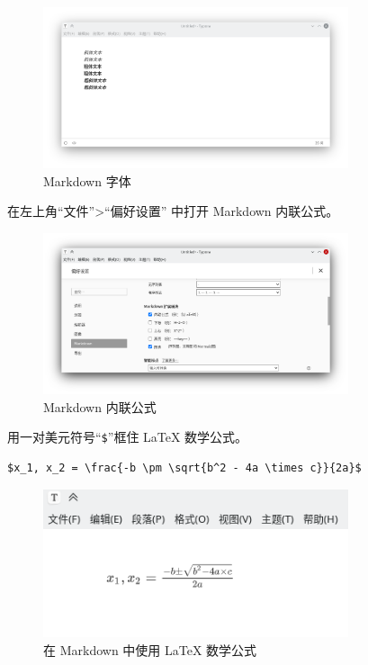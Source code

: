 \documentclass[UTF-8]{ctexart}
\begin{document}
				\begin{figure}[H]
					\centering
					\includegraphics[width=0.8\textwidth]{fig/markdown_font.png}
					\caption*{Markdown 字体}
				\end{figure}
			
				在左上角“文件”>“偏好设置” 中打开 Markdown 内联公式。
			
				\begin{figure}[H]
					\centering
					\includegraphics[width=0.8\textwidth]{fig/markdown_settings_math.png}
					\caption*{Markdown 内联公式}
				\end{figure}

				用一对美元符号“\texttt{\$}”框住 LaTeX 数学公式。
				
				\begin{verbatim}
$x_1, x_2 = \frac{-b \pm \sqrt{b^2 - 4a \times c}}{2a}$
				\end{verbatim}
			
				\begin{figure}[H]
					\centering
					\includegraphics[width=0.8\textwidth]{fig/markdown_math.png}
					\caption*{在 Markdown 中使用 LaTeX 数学公式}
				\end{figure}
				
\end{document}
